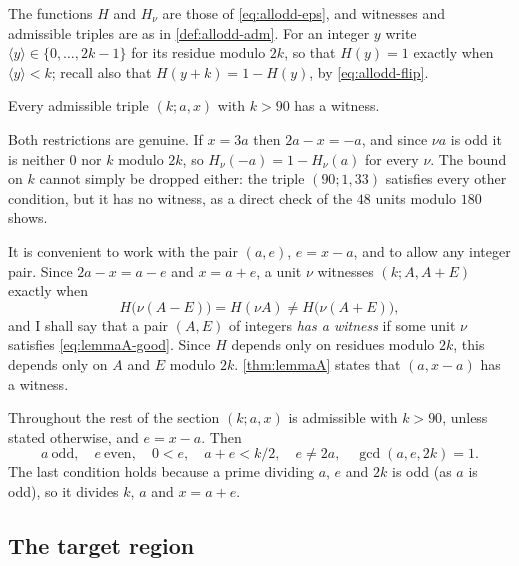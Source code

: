 The functions $H$ and $H_\nu$ are those of \eqref{eq:allodd-eps},
and witnesses and admissible triples are as in \autoref{def:allodd-adm}. For
an integer $y$ write $\langle y\rangle\in\{0,\dots,2k-1\}$ for its residue
modulo $2k$, so that $H(y)=1$ exactly when $\langle y\rangle<k$; recall also
that $H(y+k)=1-H(y)$, by \eqref{eq:allodd-flip}.

\begin{theorem}
\label{thm:lemmaA}
Every admissible triple $(k;a,x)$ with $k>90$ has a witness.
\end{theorem}

Both restrictions are genuine. If $x=3a$ then $2a-x=-a$, and since $\nu a$ is
odd it is neither $0$ nor $k$ modulo $2k$, so $H_\nu(-a)=
1-H_\nu(a)$ for every $\nu$. The bound on $k$ cannot simply be
dropped either: the triple $(90;1,33)$ satisfies every other condition, but
it has no witness, as a direct check of the $48$ units modulo $180$ shows.

It is convenient to work with the pair $(a,e)$, $e=x-a$, and to allow any
integer pair. Since $2a-x=a-e$ and $x=a+e$, a unit $\nu$ witnesses
$(k;A,A+E)$ exactly when
\begin{equation}
H\bigl(\nu(A-E)\bigr)=H(\nu A)\ne H\bigl(\nu(A+E)\bigr),
\label{eq:lemmaA-good}
\end{equation}
and I shall say that a pair $(A,E)$ of integers \emph{has a witness} if some
unit $\nu$ satisfies \eqref{eq:lemmaA-good}. Since $H$ depends only on residues
modulo $2k$, this depends only on $A$ and $E$ modulo $2k$.
\autoref{thm:lemmaA} states that $(a,x-a)$ has a witness.

Throughout the rest of the section $(k;a,x)$ is admissible with $k>90$,
unless stated otherwise, and $e=x-a$. Then
\begin{equation}
a\ \text{odd},\quad e\ \text{even},\quad 0<e,\quad a+e<k/2,\quad e\ne2a,
\quad \gcd(a,e,2k)=1.
\label{eq:lemmaA-adm}
\end{equation}
The last condition holds because a prime dividing $a$, $e$ and $2k$ is odd
(as $a$ is odd), so it divides $k$, $a$ and $x=a+e$.

\subsection{The target region}

